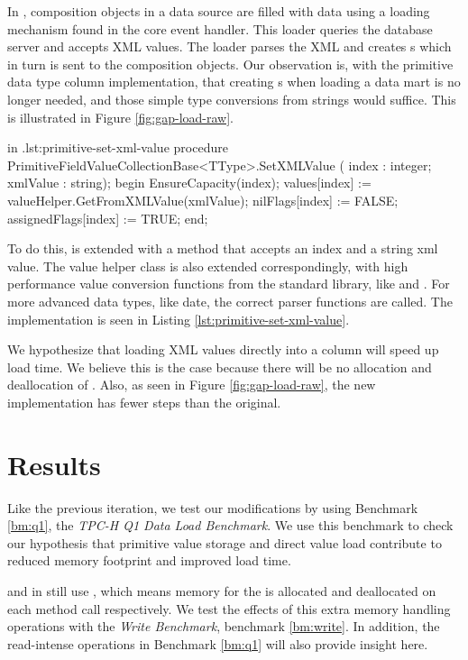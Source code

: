 In \gap, composition objects in a data source are filled with data using a loading mechanism found in the core event handler. This loader queries the database server and accepts XML values. The loader parses the XML and creates s which in turn is sent to the composition objects. Our observation is, with the primitive data type column implementation, that creating s when loading a data mart is no longer needed, and those simple type conversions from strings would suffice. This is illustrated in Figure \ref{fig:gap-load-raw}.

\begin{delphicode}{ in .}{lst:primitive-set-xml-value}
procedure PrimitiveFieldValueCollectionBase<TType>.SetXMLValue
( index : integer; xmlValue : string);
begin
  EnsureCapacity(index);
  values[index] := valueHelper.GetFromXMLValue(xmlValue);
  nilFlags[index] := FALSE;
  assignedFlags[index] := TRUE;
end;
\end{delphicode}

To do this,  is extended with a method  that accepts an index and a string xml value. The value helper class is also extended correspondingly, with high performance value conversion functions from the standard library, like  and . For more advanced data types, like date, the correct parser functions are called. The implementation is seen in Listing \ref{lst:primitive-set-xml-value}.

We hypothesize that loading XML values directly into a column will speed up load time. We believe this is the case because there will be no allocation and deallocation of . Also, as seen in Figure \ref{fig:gap-load-raw}, the new implementation has fewer steps than the original.

\section{Results}
\label{sec:storage-format-test-results}
Like the previous iteration, we test our modifications by using Benchmark \ref{bm:q1}, the \textit{TPC-H Q1 Data Load Benchmark}. We use this benchmark to check our hypothesis that primitive value storage and direct value load contribute to reduced memory footprint and improved load time. 

 and  in  still use , which means memory for the  is allocated and deallocated on each method call respectively. We test the effects of this extra memory handling operations with the \textit{Write Benchmark}, benchmark \ref{bm:write}. In addition, the read-intense operations in Benchmark \ref{bm:q1} will also provide insight here.

